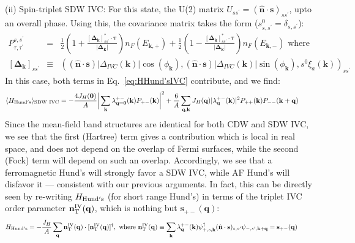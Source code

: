 \documentclass[aps,pra,twocolumn,superscriptaddress,10pt,article,nofootinbib,showpacs,longbibliography]{revtex4-1}
\def \k{{\mathbf k}}
\def \n{{\mathbf n}}
\def \q{{\mathbf q}}
\def \s{{\mathbf s}}
\def \beq{\begin{eqnarray}}
\def \eeq{\end{eqnarray}}
\def \nn{\nonumber \\}
\begin{document}
(ii) Spin-triplet SDW IVC: For this state, the U(2) matrix $U_{s s^\prime} = (\hat{\n}\cdot \s)_{s s^\prime}$, upto an overall phase.
Using this, the covariance matrix takes the form ($s^0_{s,s^\prime} = \delta_{s,s^\prime}$): 
\beq 
P^{s,s^\prime}_{\tau,\tau^\prime} &=& \frac{1}{2}\left( 1 + \frac{\left[\bm{\Delta}_{\k}\right]_{s s^\prime}^* \cdot \bm{\tau}}{|\bm{\Delta_\k|}} \right) n_F(E_{\k,+}) + \frac{1}{2}\left( 1 - \frac{\left[\bm{\Delta}_{\k}\right]_{s s^\prime}^* \cdot \bm{\tau}}{|\bm{\Delta_\k|}} \right) n_F(E_{\k,-}) \text{ where } \nn
\left[\bm{\Delta}_{\k}\right]_{s s^\prime} &\equiv& \left( (\hat{\n} \cdot \s) |\Delta_{IVC}(\k)| \cos(\phi_\k) , (\hat{\n} \cdot \s) |\Delta_{IVC}(\k)| \sin(\phi_\k),  s^0 \xi_a(\k) \right)_{s s^\prime}
\eeq
In this case, both terms in Eq.~\eqref{eq:HHund'sIVC} contribute, and we find:
\beq
\langle H_{\rm Hund's} \rangle_{\rm SDW ~IVC} = - \frac{4 J_H(\mathbf{0})}{A}  \bigg| \sum_\k \lambda^{+-}_{\q = \mathbf{0}}(\k)  P_{+-}(\k) \bigg|^2  + \frac{6}{A} \sum_{\q, \k} J_H(\q) |\lambda^{+-}_{\q}(\k)|^2 P_{++}(\k) P_{--}(\k+\q) ~~~~~~
\eeq
Since the mean-field band structures are identical for both CDW and SDW IVC, we see that the first (Hartree) term gives a contribution which is local in real space, and does not depend on the overlap of Fermi surfaces, while the second (Fock) term will depend on such an overlap. 
Accordingly, we see that a ferromagnetic Hund's will strongly favor a SDW IVC, while AF Hund's will disfavor it --- consistent with our previous arguments. 
In fact, this can be directly seen by re-writing $H_{\rm Hund's}$ (for short range Hund's) in terms of the triplet IVC order parameter $\n^{\rm IV}_{\rm T}(\q)$, which is nothing but $\s_{+-}(\q)$:
\beq
H_{\rm Hund's}  = - \frac{J_H}{A} \sum_{\q}  \n^{\rm IV}_{\rm T}(\q) \cdot [\n^{\rm IV}_{\rm T}(\q)]^\dagger, \text{ where } \n^{\rm IV}_{\rm T}(\q) \equiv \sum_\k \lambda^{+-}_\q(\k) \psi^\dagger_{+,s,\k} (\hat{\n} \cdot \s)_{s,s^\prime} \psi_{-,s^\prime, \k + \q}  = \s_{+-}(\q) ~~~~~~~
\eeq
\end{document}
